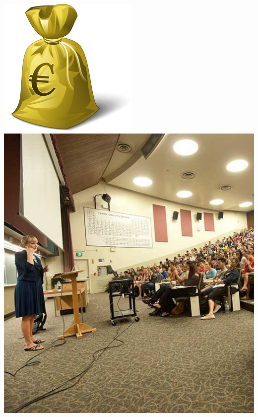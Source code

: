 \begin{frame}
\begin{columns}
    \begin{column}{0.3\textwidth}
      \includegraphics[width=.9\textwidth]{images/moneybag_euro}\\
      \bigskip
      \includegraphics[width=1.0\textwidth]{images/bigclass}
    \end{column}
  \end{columns}
\end{frame}

